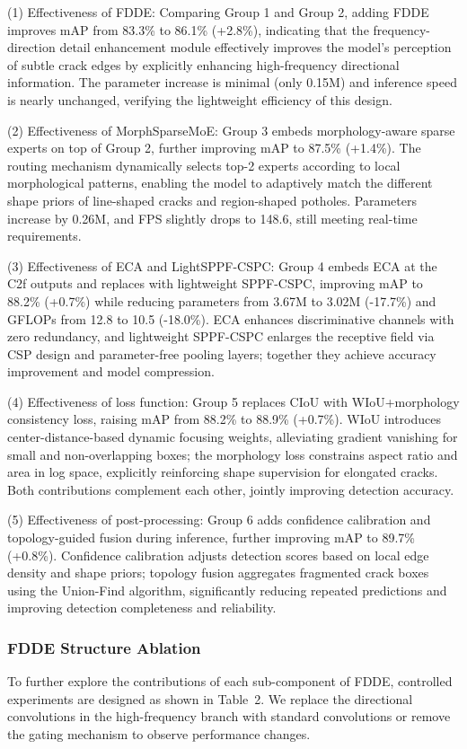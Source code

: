 \documentclass[twocolumn]{sn-jnl}
\begin{document}
	(1) Effectiveness of FDDE: Comparing Group 1 and Group 2, adding FDDE improves mAP from 83.3\% to 86.1\% (+2.8\%), indicating that the frequency-direction detail enhancement module effectively improves the model's perception of subtle crack edges by explicitly enhancing high-frequency directional information. The parameter increase is minimal (only 0.15M) and inference speed is nearly unchanged, verifying the lightweight efficiency of this design.
	
	(2) Effectiveness of MorphSparseMoE: Group 3 embeds morphology-aware sparse experts on top of Group 2, further improving mAP to 87.5\% (+1.4\%). The routing mechanism dynamically selects top-2 experts according to local morphological patterns, enabling the model to adaptively match the different shape priors of line-shaped cracks and region-shaped potholes. Parameters increase by 0.26M, and FPS slightly drops to 148.6, still meeting real-time requirements.
	
	(3) Effectiveness of ECA and LightSPPF-CSPC: Group 4 embeds ECA at the C2f outputs and replaces with lightweight SPPF-CSPC, improving mAP to 88.2\% (+0.7\%) while reducing parameters from 3.67M to 3.02M (-17.7\%) and GFLOPs from 12.8 to 10.5 (-18.0\%). ECA enhances discriminative channels with zero redundancy, and lightweight SPPF-CSPC enlarges the receptive field via CSP design and parameter-free pooling layers; together they achieve accuracy improvement and model compression.
	
	(4) Effectiveness of loss function: Group 5 replaces CIoU with WIoU+morphology consistency loss, raising mAP from 88.2\% to 88.9\% (+0.7\%). WIoU introduces center-distance-based dynamic focusing weights, alleviating gradient vanishing for small and non-overlapping boxes; the morphology loss constrains aspect ratio and area in log space, explicitly reinforcing shape supervision for elongated cracks. Both contributions complement each other, jointly improving detection accuracy.
	
	(5) Effectiveness of post-processing: Group 6 adds confidence calibration and topology-guided fusion during inference, further improving mAP to 89.7\% (+0.8\%). Confidence calibration adjusts detection scores based on local edge density and shape priors; topology fusion aggregates fragmented crack boxes using the Union-Find algorithm, significantly reducing repeated predictions and improving detection completeness and reliability.
	
	\subsubsection{FDDE Structure Ablation}
	To further explore the contributions of each sub-component of FDDE, controlled experiments are designed as shown in Table~2. We replace the directional convolutions in the high-frequency branch with standard convolutions or remove the gating mechanism to observe performance changes.
	
\end{document}
